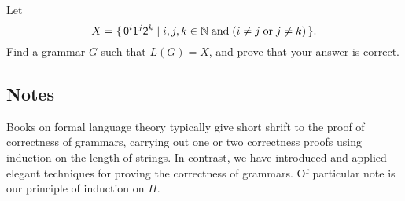 \begin{exercise}
Let
\begin{displaymath}
X = \{ \, \mathsf{0}^i\mathsf{1}^j\mathsf{2}^k \mid i,j,k\in\mathbb{N}\;\allowbreak\mbox{and}\allowbreak\;
(i\neq j\;\allowbreak\mbox{or}\allowbreak\;j\neq k) \, \} .
\end{displaymath}
Find a grammar $G$ such that $L(G) = X$, and prove that your answer is
correct.
\end{exercise}

\subsection{Notes}

Books on formal language theory typically give short shrift to the
proof of correctness of grammars, carrying out one or two
correctness proofs using induction on the length of strings.  In
contrast, we have introduced and applied elegant techniques for
proving the correctness of grammars.  Of particular note is our principle
of induction on $\Pi$.

